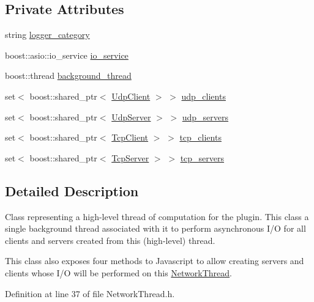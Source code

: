 \subsection*{Private Attributes}
\begin{DoxyCompactItemize}
\item 
string \hyperlink{classNetworkThread_a042e0a67fcd12363be06de1967410a61}{logger\_\-category}
\item 
boost::asio::io\_\-service \hyperlink{classNetworkThread_a8dd2b75a9da06933cedfb086390fc522}{io\_\-service}
\item 
boost::thread \hyperlink{classNetworkThread_ac9a925860e33ec1afb88a2b2f91e24c6}{background\_\-thread}
\item 
set$<$ boost::shared\_\-ptr$<$ \hyperlink{classUdpClient}{UdpClient} $>$ $>$ \hyperlink{classNetworkThread_a5763ee354a9fff9e8b5f56961b1c3f92}{udp\_\-clients}
\item 
set$<$ boost::shared\_\-ptr$<$ \hyperlink{classUdpServer}{UdpServer} $>$ $>$ \hyperlink{classNetworkThread_acd2cc1475b8ebeafd3e7dafc835dbec4}{udp\_\-servers}
\item 
set$<$ boost::shared\_\-ptr$<$ \hyperlink{classTcpClient}{TcpClient} $>$ $>$ \hyperlink{classNetworkThread_af502746d9b95956a36cadba40a8a1f36}{tcp\_\-clients}
\item 
set$<$ boost::shared\_\-ptr$<$ \hyperlink{classTcpServer}{TcpServer} $>$ $>$ \hyperlink{classNetworkThread_a7948c2fc23492ed42115bd710a8889a1}{tcp\_\-servers}
\end{DoxyCompactItemize}


\subsection{Detailed Description}
Class representing a high-\/level thread of computation for the plugin. This class a single background thread associated with it to perform asynchronous I/O for all clients and servers created from this (high-\/level) thread.

This class also exposes four methods to Javascript to allow creating servers and clients whose I/O will be performed on this {\ttfamily \hyperlink{classNetworkThread}{NetworkThread}}. 

Definition at line 37 of file NetworkThread.h.



